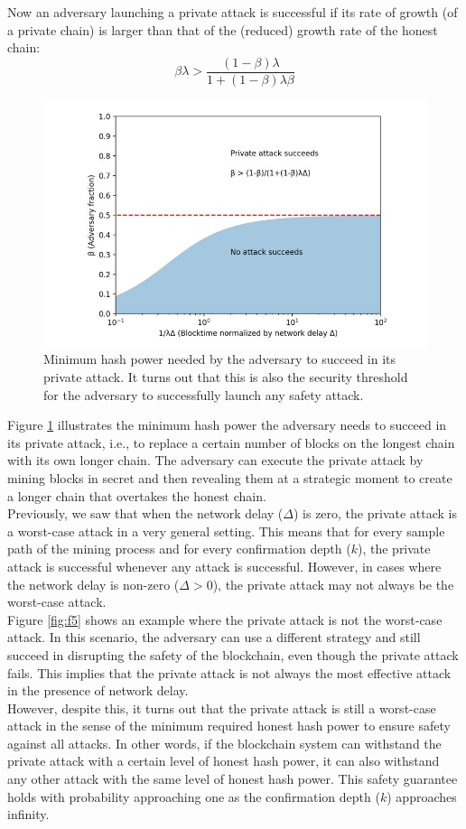 \documentclass{report}
\begin{document}
Now an adversary launching a private attack is successful if its rate of growth (of a private chain) is larger than that of the (reduced) growth rate of the honest chain:
\begin{equation}
	\beta \lambda > \frac{(1 - \beta) \lambda}{1 + (1 - \beta) \lambda \beta}
\end{equation}
\begin{figure}[h!]
	\centering
	\includegraphics[width=0.6\linewidth]{Fig/F4}
	\caption{Minimum hash power needed by the adversary to succeed in its private attack. It turns
		out that this is also the security threshold for the adversary to successfully launch any safety attack.}
	\label{fig:f4}
\end{figure}
Figure \ref{fig:f4} illustrates the minimum hash power the adversary needs to succeed in its private attack, i.e., to replace a certain number of blocks on the longest chain with its own longer chain. The adversary can execute the private attack by mining blocks in secret and then revealing them at a strategic moment to create a longer chain that overtakes the honest chain.\\
Previously, we saw that when the network delay ($\Delta$) is zero, the private attack is a worst-case attack in a very general setting. This means that for every sample path of the mining process and for every confirmation depth ($k$), the private attack is successful whenever any attack is successful. However, in cases where the network delay is non-zero ($\Delta > 0$), the private attack may not always be the worst-case attack.\\
Figure \ref{fig:f5} shows an example where the private attack is not the worst-case attack. In this scenario, the adversary can use a different strategy and still succeed in disrupting the safety of the blockchain, even though the private attack fails. This implies that the private attack is not always the most effective attack in the presence of network delay.\\
However, despite this, it turns out that the private attack is still a worst-case attack in the sense of the minimum required honest hash power to ensure safety against all attacks. In other words, if the blockchain system can withstand the private attack with a certain level of honest hash power, it can also withstand any other attack with the same level of honest hash power. This safety guarantee holds with probability approaching one as the confirmation depth ($k$) approaches infinity.\\
\end{document}
